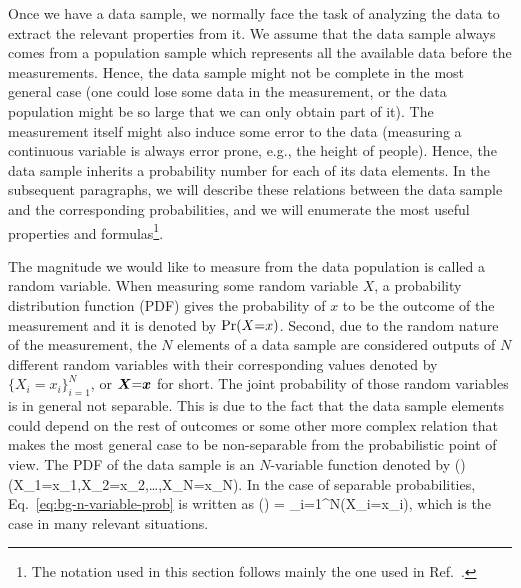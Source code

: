 Once we have a data sample, we normally face the task of analyzing the data to extract the relevant properties from it.
We assume that the data sample always comes from a population sample which represents all the available data before the measurements.
Hence, the data sample might not be complete in the most general case (one could lose some data in the measurement, or the data population might be so large that we can only obtain part of it).
The measurement itself might also induce some error to the data (measuring a continuous variable is always error prone, e.g., the height of people).
Hence, the data sample inherits a probability number for each of its data elements.
In the subsequent paragraphs, we will describe these relations between the data sample and the corresponding probabilities, and we will enumerate the most useful properties and formulas\footnote{The notation used in this section follows mainly the one used in Ref.~\cite{Riley2006}.}.

The magnitude we would like to measure from the data population is called a random variable.
When measuring some random variable $X$, a probability distribution function (PDF) gives the probability of $x$ to be the outcome of the measurement and it is denoted by $\text{Pr}(X{=}x)$.
Second, due to the random nature of the measurement, the $N$ elements of a data sample are considered outputs of $N$ different random variables with their corresponding values denoted by $\{X_i{=}x_i\}_{i=1}^N$, or $\boldsymbol{X}{=}\boldsymbol{x}$ for short.
The joint probability of those random variables is in general not separable.
This is due to the fact that the data sample elements could depend on the rest of outcomes or some other more complex relation that makes the most general case to be non-separable from the probabilistic point of view.
The PDF of the data sample is an $N$-variable function denoted by
\be
  \prob() \equiv \prob(X_1{=}x_1,X_2{=}x_2,\dots,X_N{=}x_N).
  \label{eq:bg-n-variable-prob}
\ee
In the case of separable probabilities, Eq.~\eqref{eq:bg-n-variable-prob} is written as
\be
  \prob() = \prod_{i=1}^N\prob(X_i{=}x_i),
  \label{eq:bg-separable-likelyhood}
\ee
which is the case in many relevant situations.

